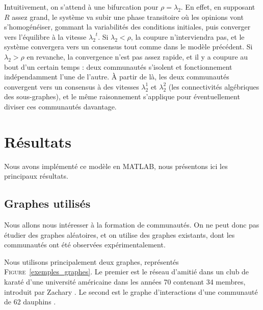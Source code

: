 \documentclass[12pt]{article}
\newcommand{\fig}[1]{\textsc{Figure}~\ref{#1}}
\begin{document}
Intuitivement, on s'attend à une bifurcation pour $\rho = \lambda_2$. En
effet, en supposant $R$ assez grand, le système va subir une phase transitoire
où les opinions vont s'homogénéiser, gommant la variabilités des conditions
initiales, puis converger vers l'équilibre à la vitesse ${\lambda_2}^t$. Si
$\lambda_2 < \rho$, la coupure n'interviendra pas, et le système convergera
vers un consensus tout comme dans le modèle précédent. Si $\lambda_2 > \rho$
en revanche, la convergence n'est pas assez rapide, et il y a coupure au bout
d'un certain temps : deux communautés s'isolent et fonctionnement
indépendamment l'une de l'autre. À partir de là, les deux communautés
convergent vers un consensus à des vitesses $\lambda_2^1$ et $\lambda_2^2$
(les connectivités algébriques des sous-graphes), et le même raisonnement
s'applique pour éventuellement diviser ces communautés davantage.

\section{Résultats}
Nous avons implémenté ce modèle en \textsc{MATLAB}, nous présentons ici
les principaux résultats.


\subsection{Graphes utilisés}
Nous allons nous intéresser à la formation de communautés. On ne peut
donc pas étudier des graphes aléatoires, et on utilise des graphes
existants, dont les communautés ont été observées expérimentalement.

Nous utilisons principalement deux graphes, représentés
\fig{exemples_graphes}. Le premier est le réseau d'amitié dans un club
de karaté d'une université américaine dans les années 70 contenant 34
membres, introduit par Zachary \cite{zachary}. Le second est le graphe
d'interactions d'une communauté de 62 dauphins \cite{dolphins}.
\end{document}

